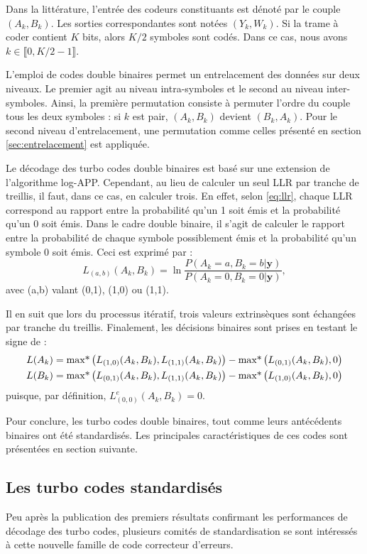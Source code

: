 Dans la littérature, l'entrée des codeurs constituants est dénoté par le couple $(A_k,B_k)$. Les sorties correspondantes 
sont notées $(Y_k,W_k)$. Si la trame à coder contient $K$ bits, alors $K/2$ symboles sont codés. Dans ce cas, nous avons 
$k \in \llbracket 0, K/2-1\rrbracket$.

L'emploi de codes double binaires permet un entrelacement des données sur deux niveaux. Le premier agit au niveau 
intra-symboles et le second au niveau inter-symboles. Ainsi, la première permutation consiste à permuter l'ordre du 
couple tous les deux symboles : si $k$ est pair, $(A_k,B_k)$ devient $(B_k,A_k)$. Pour le second niveau d'entrelacement, 
une permutation comme celles présenté en section \ref{sec:entrelacement} est appliquée.

Le décodage des turbo codes double binaires est basé sur une extension de l'algorithme log-APP. Cependant, au lieu de 
calculer un seul LLR par tranche de treillis, il faut, dans ce cas, en calculer trois. En effet, selon \ref{eq:llr}, 
chaque LLR correspond au rapport entre la probabilité qu'un 1 soit émis et la probabilité qu'un 0 soit émis. Dans le 
cadre double binaire, il s'agit de calculer le rapport entre la probabilité de chaque symbole possiblement émis et la 
probabilité qu'un symbole 0 soit émis. Ceci est exprimé par : 
\begin{equation*}
	L_{(a,b)}(A_k,B_k) = \ln\frac{P(A_k=a,B_k=b|\mathbf{y})}{P(A_k=0,B_k=0|\mathbf{y})},
\end{equation*}
avec (a,b) valant (0,1), (1,0) ou (1,1).

Il en suit que lors du processus itératif, trois valeurs extrinsèques sont échangées par tranche du treillis.
Finalement, les décisions binaires sont prises en testant le signe de : 
\begin{align*}
	L(A_k) & = \operatorname*{max*} \left(L_{(1,0)}(A_k,B_k),L_{(1,1)}(A_k,B_k)\right) - \operatorname*{max*} \left(L_{(0,1)}(A_k,B_k),0\right) \\
	L(B_k) & = \operatorname*{max*} \left(L_{(0,1)}(A_k,B_k),L_{(1,1)}(A_k,B_k)\right) - \operatorname*{max*} \left(L_{(1,0)}(A_k,B_k),0\right) 
\end{align*}
puisque, par définition, $L^e_{(0,0)}(A_k,B_k)=0$.

Pour conclure, les turbo codes double binaires, tout comme leurs antécédents binaires ont été standardisés. Les 
principales caractéristiques de ces codes sont présentées en section suivante.

\subsection{Les turbo codes standardisés}
Peu après la publication des premiers résultats confirmant les performances de décodage des turbo codes, plusieurs 
comités de standardisation se sont intéressés à cette nouvelle famille de code correcteur d'erreurs.

